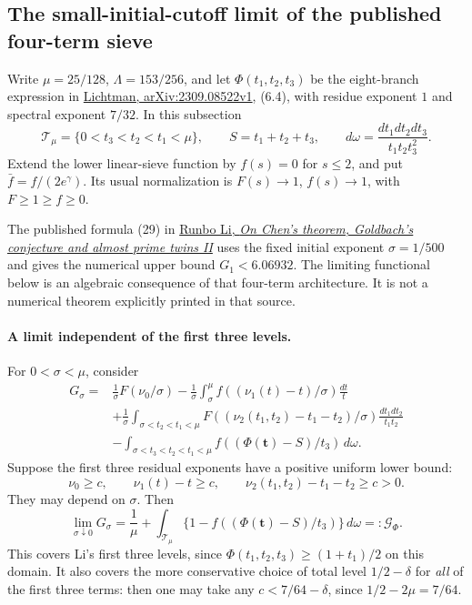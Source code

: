
\subsection{The small-initial-cutoff limit of the published four-term sieve}
\label{sec:g1-limit-comparison}

Write $\mu=25/128$, $\Lambda=153/256$, and let
$\Phi(t_1,t_2,t_3)$ be the eight-branch expression in
\href{https://arxiv.org/html/2309.08522v1}{Lichtman,
arXiv:2309.08522v1}, (6.4), with residue exponent $1$ and
spectral exponent $7/32$. In this subsection
\[
 \mathcal T_\mu=\{0<t_3<t_2<t_1<\mu\},\qquad
 S=t_1+t_2+t_3,\qquad d\omega=\frac{dt_1dt_2dt_3}{t_1t_2t_3^2}.
\]
Extend the lower linear-sieve function by $f(s)=0$ for $s\le2$,
and put $\bar f=f/(2e^\gamma)$. Its usual normalization is
$F(s)\to1$, $f(s)\to1$, with $F\ge1\ge f\ge0$.

The published formula (29) in
\href{https://imar.ro/journals/Mathematical_Reports/Pdfs/2026/1_2/3.pdf}
{Runbo Li, \emph{On Chen's theorem, Goldbach's conjecture and almost
prime twins II}} uses the fixed initial exponent $\sigma=1/500$
and gives the numerical upper bound $G_1<6.06932$.
The limiting functional below is an algebraic consequence of that
four-term architecture. It is not a numerical theorem explicitly
printed in that source.

\paragraph{A limit independent of the first three levels.}
For $0<\sigma<\mu$, consider
\begin{align*}
 G_\sigma={}&\frac1\sigma F(\nu_0/\sigma)
 -\frac1\sigma\int_\sigma^\mu
          f((\nu_1(t)-t)/\sigma)\frac{dt}{t}\\
 &+\frac1\sigma\int_{\sigma<t_2<t_1<\mu}
          F((\nu_2(t_1,t_2)-t_1-t_2)/\sigma)
                         \frac{dt_1dt_2}{t_1t_2}\\
 &-\int_{\sigma<t_3<t_2<t_1<\mu}
          f((\Phi(\boldsymbol t)-S)/t_3)\,d\omega.
\end{align*}
Suppose the first three residual exponents have a positive uniform
lower bound:
\[
 \nu_0\ge c,\qquad \nu_1(t)-t\ge c,\qquad
 \nu_2(t_1,t_2)-t_1-t_2\ge c>0.
\]
They may depend on $\sigma$. Then
\begin{equation}\label{eq:g1-limit-identity}
 \lim_{\sigma\downarrow0}G_\sigma
 =\frac1\mu+\int_{\mathcal T_\mu}
       \{1-f((\Phi(\boldsymbol t)-S)/t_3)\}\,d\omega
 =:\mathcal G_\Phi.
\end{equation}
This covers Li's first three levels, since
$\Phi(t_1,t_2,t_3)\ge(1+t_1)/2$ on this domain. It also covers
the more conservative choice of total level $1/2-\delta$ for
\emph{all} of the first three terms: then one may take any
$c<7/64-\delta$, since $1/2-2\mu=7/64$.

